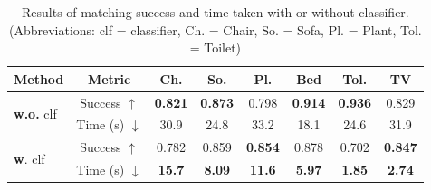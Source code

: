 \begin{table}[tb]
    \centering
    \small %
    \renewcommand{\arraystretch}{1.2} %
    \setlength{\tabcolsep}{3pt} %
    \begin{tabular}{lccccccc}
        \hline
        Method & Metric & Ch. & So. & Pl. & Bed & Tol. & TV \\
        \hline
        \multirow{2}{*}{\textbf{w.o.} clf} & Success $\uparrow$ & \textbf{0.821} & \textbf{0.873} & 0.798 & \textbf{0.914} & \textbf{0.936} & 0.829 \\
        \cline{2-8}
        & Time (s) $\downarrow$ & 30.9 & 24.8 & 33.2 & 18.1 & 24.6 & 31.9 \\
        \hline
        \multirow{2}{*}{\textbf{w}. clf} & Success $\uparrow$ & 0.782 & 0.859 & \textbf{0.854} & 0.878 & 0.702 & \textbf{0.847} \\
        \cline{2-8}
        & Time (s) $\downarrow$ & \textbf{15.7} & \textbf{8.09} & \textbf{11.6} & \textbf{5.97} & \textbf{1.85} & \textbf{2.74}  \\
        \hline
    \end{tabular}
    \vspace{5pt}
    \caption{Results of matching success and time taken with or without classifier.(Abbreviations: clf = classifier, Ch. = Chair, So. = Sofa, Pl. = Plant, Tol. = Toilet)}
    \vspace{-24pt}
    \label{tab:abla_classifier}
\end{table}


